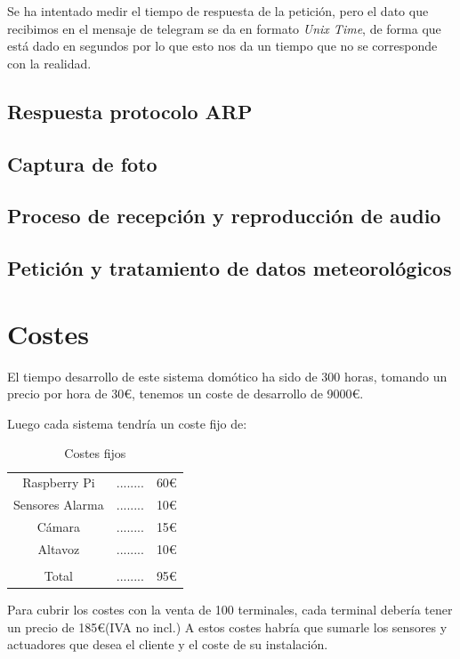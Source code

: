 \documentclass[10pt,journal,compsoc]{IEEEtran}
\begin{document}
Se ha intentado medir el tiempo de respuesta de la petición, pero el dato que recibimos en el mensaje de telegram se da en formato \textit{Unix Time}, de forma que está dado en segundos por lo que esto nos da un tiempo que no se corresponde con la realidad.

\subsection{Respuesta protocolo ARP}

\subsection{Captura de foto}

\subsection{Proceso de recepción y reproducción de audio}

\subsection{Petición y tratamiento de datos meteorológicos}


\section{Costes}
El tiempo desarrollo de este sistema domótico ha sido de 300 horas, tomando un 
precio por hora de 30\euro, tenemos un coste de desarrollo de 9000\euro.

Luego cada sistema tendría un coste fijo de:
\begin{table}[h]
\centering
\begin{tabular}{ccc}
Raspberry Pi & ........ & 60\euro \\
Sensores Alarma & ........ & 10\euro \\
Cámara & ........ & 15\euro \\
Altavoz & ........ & 10\euro \\
\hline \\
Total & ........ & 95\euro \\
\end{tabular} 
\caption{Costes fijos}
\label{tab:CostesFij}
\end{table}

Para cubrir los costes con la venta de 100 terminales, cada terminal debería tener un precio de 
185\euro (IVA no incl.)
A estos costes habría que sumarle los sensores y actuadores que desea el cliente y el coste 
de su instalación.
\end{document}

